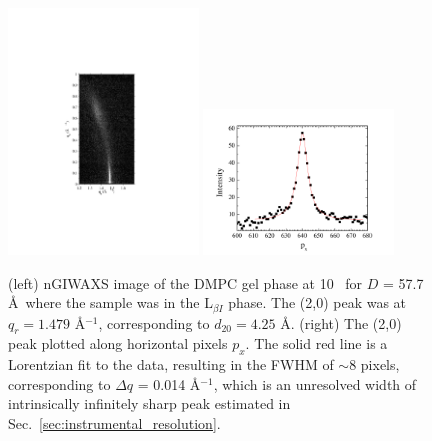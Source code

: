 \begin{figure}[htbp]
  \centering
  \includegraphics[trim=150 190 150 180,clip,width=0.45\textwidth]{figures/ripple/nGIWAXS/dmpc1_107}
  \includegraphics[trim=50 0 50 0,clip,width=0.45\textwidth]{figures/ripple/nGIWAXS/dmpc1_107_gel_phase_20_swath_8px}
  \caption[nGIWAXS of the DMPC gel phase]{(left) nGIWAXS image of the DMPC gel phase
  at 10 \textcelsius\ for $D$ = 57.7 \AA\ where the sample was in the 
  L$_{\beta I}$ phase. The (2,0) peak was at
  $q_r=1.479$ \AA$^{-1}$, corresponding to $d_{20}=4.25$ \AA.
  (right) The (2,0) peak plotted along horizontal pixels $p_x$. The solid red
  line is a Lorentzian fit to the data, resulting in the FWHM of $\sim$8 pixels,
  corresponding to $\Delta q$ = 0.014 \AA$^{-1}$,
  which is an unresolved width of intrinsically infinitely sharp peak
  estimated in Sec.~\ref{sec:instrumental_resolution}.}
  \label{fig:gel_phase}  
\end{figure}

